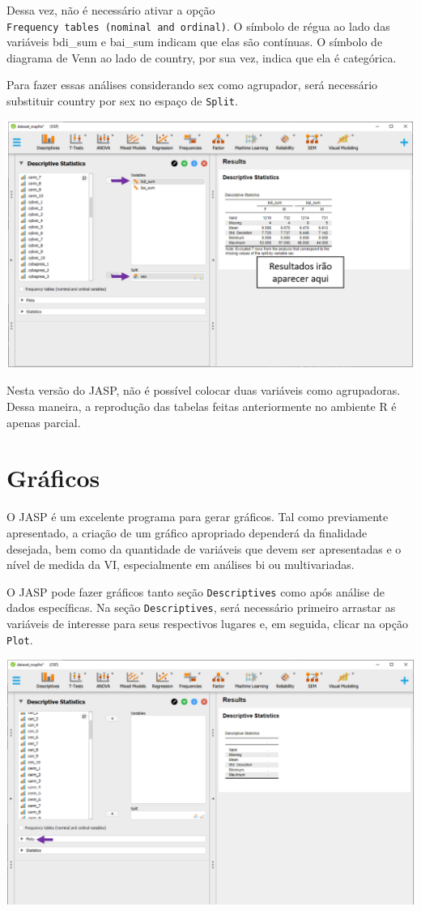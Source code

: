 \documentclass[
]{book}
\begin{document}
Dessa vez, não é necessário ativar a opção \texttt{Frequency\ tables\ (nominal\ and\ ordinal)}. O símbolo de régua ao lado das variáveis bdi\_sum e bai\_sum indicam que elas são contínuas. O símbolo de diagrama de Venn ao lado de country, por sua vez, indica que ela é categórica.

Para fazer essas análises considerando sex como agrupador, será necessário substituir country por sex no espaço de \texttt{Split}.

\includegraphics{./img/cap_desc_jasp_proporcao_duas_variaveis_split3.png}

Nesta versão do JASP, não é possível colocar duas variáveis como agrupadoras. Dessa maneira, a reprodução das tabelas feitas anteriormente no ambiente R é apenas parcial.

\hypertarget{gruxe1ficos-2}{%
\section{Gráficos}\label{gruxe1ficos-2}}

O JASP é um excelente programa para gerar gráficos. Tal como previamente apresentado, a criação de um gráfico apropriado dependerá da finalidade desejada, bem como da quantidade de variáveis que devem ser apresentadas e o nível de medida da VI, especialmente em análises bi ou multivariadas.

O JASP pode fazer gráficos tanto seção \texttt{Descriptives} como após análise de dados específicas. Na seção \texttt{Descriptives}, será necessário primeiro arrastar as variáveis de interesse para seus respectivos lugares e, em seguida, clicar na opção \texttt{Plot}.

\includegraphics{./img/cap_desc_jasp_graficos.png}
\end{document}
